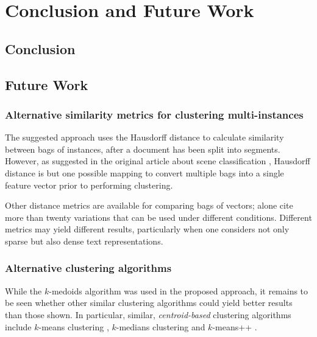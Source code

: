 \chapter{Conclusion and Future Work}\label{chap: conclusion}


\section{Conclusion}


\section{Future Work}

\subsection{Alternative similarity metrics for clustering multi-instances}

The suggested approach uses the Hausdorff distance to calculate similarity between bags of instances, after a document has been split into segments. However, as suggested in the original article about scene classification \citep{zhou_zhang_2006}, Hausdorff distance is but one possible mapping to convert multiple bags into a single feature vector prior to performing clustering. 

Other distance metrics are available for comparing bags of vectors; \cite{huttenlocher_etal_1993} alone cite more than twenty variations that can be used under different conditions. Different metrics may yield different results, particularly when one considers not only sparse but also dense text representations.

\subsection{Alternative clustering algorithms}

While the $k$-medoids algorithm was used in the proposed approach, it remains to be seen whether other similar clustering algorithms could yield better results than those shown. In particular, similar, \textit{centroid-based} clustering algorithms include $k$-means clustering \citep{macqueen_1967}, $k$-medians clustering \citep{jain_dubes_1988} and $k$-means++ \citep{arthur_vassilvitskii_2007}.

